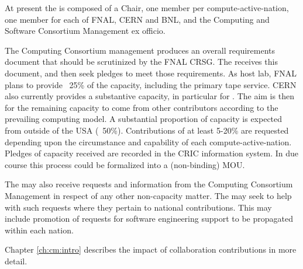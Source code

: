 \documentclass[../main-v1.tex]{subfiles}
\begin{document}
At present the  is composed of a Chair, one member per compute-active-nation, one member for each of FNAL, CERN and BNL, and the Computing and Software Consortium  Management ex officio.

The Computing Consortium management produces an overall requirements document that should be scrutinized by the FNAL CRSG. The  receives this document, and then seek pledges to meet those requirements. As host lab, FNAL plans to provide ~25\% of the capacity, including the primary tape service.
CERN also currently provides a substantive capacity, in particular for .
The aim is then for the remaining capacity to come from other contributors according to the prevailing computing model. A substantial proportion of capacity is expected from outside of the USA  (~50\%). Contributions of at least 5-20\% are requested depending upon the circumstance and capability of each compute-active-nation.
Pledges of capacity received are recorded in the CRIC information system. In due course this process could be formalized into a (non-binding) MOU.

The  may also receive requests and information from the Computing Consortium Management in respect of any other non-capacity matter. The  may seek to help with such requests where they pertain to national contributions. This may include promotion of requests for software engineering support to be propagated within each nation.  

Chapter \ref{ch:cm:intro} describes the impact of  collaboration contributions in more detail. 


\end{document}
